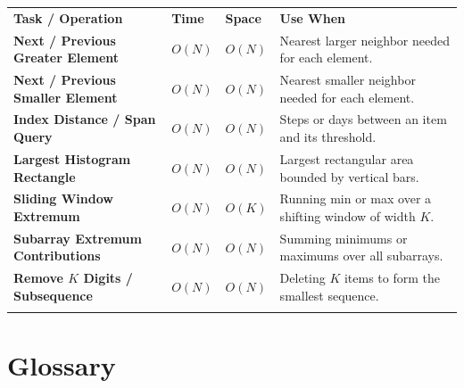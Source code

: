\documentclass[11pt,a4paper]{article}
\theoremstyle{definition}
\begin{document}
\begin{center}
\begingroup
\small
{}
\begin{tabularx}{\textwidth}{>{\raggedright\arraybackslash\bfseries}p{4.3cm} >{\centering\arraybackslash}p{1.5cm} >{\centering\arraybackslash}p{1.5cm} >{\raggedright\arraybackslash}X}
\arrayrulecolor{primaryblue}\toprule[1.2pt]
\rowcolor{primaryblue!10}
\textcolor{primaryblue}{\textbf{Task / Operation}} & \textcolor{primaryblue}{\textbf{Time}} & \textcolor{primaryblue}{\textbf{Space}} & \textcolor{primaryblue}{\textbf{Use When}} \\
\arrayrulecolor{codeframe}\midrule[0.6pt]
Next / Previous Greater Element & $O(N)$ & $O(N)$ & Nearest larger neighbor needed for each element. \\
Next / Previous Smaller Element & $O(N)$ & $O(N)$ & Nearest smaller neighbor needed for each element. \\
Index Distance / Span Query & $O(N)$ & $O(N)$ & Steps or days between an item and its threshold. \\
Largest Histogram Rectangle & $O(N)$ & $O(N)$ & Largest rectangular area bounded by vertical bars. \\
Sliding Window Extremum & $O(N)$ & $O(K)$ & Running min or max over a shifting window of width $K$. \\
Subarray Extremum Contributions & $O(N)$ & $O(N)$ & Summing minimums or maximums over all subarrays. \\
Remove $K$ Digits / Subsequence & $O(N)$ & $O(N)$ & Deleting $K$ items to form the smallest sequence. \\
\arrayrulecolor{primaryblue}\bottomrule[1.2pt]
\end{tabularx}
\endgroup
\end{center}

\section{Glossary}
\end{document}
